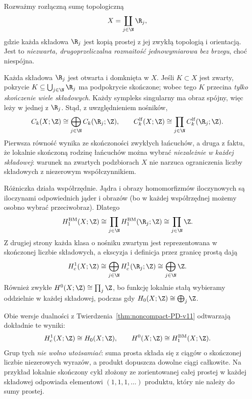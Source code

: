 \begin{przyklad}
\label{prz:BM-countable-lines}
Rozważmy rozłączną sumę topologiczną
\[
 X=\coprod_{j\in\N}\R_j,
\]
gdzie każda składowa $\R_j$ jest kopią prostej
z jej zwykłą topologią i orientacją.
Jest to \emph{niezwarta, drugoprzeliczalna
rozmaitość jednowymiarowa bez brzegu}, choć niespójna.

Każda składowa $\R_j$ jest otwarta i domknięta w $X$.
Jeśli $K\subset X$ jest zwarty, pokrycie
$K\subseteq\bigcup_{j\in\N}\R_j$
ma podpokrycie skończone; wobec tego
$K$ przecina \emph{tylko skończenie wiele składowych}.
Każdy sympleks singularny ma obraz spójny,
więc leży w jednej z $\R_j$.
Stąd, z uwzględnieniem nośników,
\[
 C_k(X;\Z)\cong\bigoplus_{j\in\N}C_k(\R_j;\Z),
 \qquad
 C_k^{\mathrm{lf}}(X;\Z)\cong
     \prod_{j\in\N}C_k^{\mathrm{lf}}(\R_j;\Z).
\]
Pierwsza równość wynika ze skończoności
zwykłych łańcuchów, a druga z faktu,
że lokalnie skończoną rodzinę łańcuchów
można wybrać \emph{niezależnie w każdej składowej}:
warunek na zwartych podzbiorach $X$
nie narzuca ograniczenia liczby składowych
z niezerowym współczynnikiem.

Różniczka działa współrzędnie.
Jądra i obrazy homomorfizmów iloczynowych
są iloczynami odpowiednich jąder i obrazów
(bo w każdej współrzędnej możemy osobno
wybrać przeciwobraz). Dlatego
\[
 H_1^{\mathrm{BM}}(X;\Z)
 \cong\prod_{j\in\N}
       H_1^{\mathrm{BM}}(\R_j;\Z)
 \cong\prod_{j\in\N}\Z.
\]
Z drugiej strony każda klasa o nośniku zwartym
jest reprezentowana w skończonej liczbie
składowych, a ekscyzja i definicja przez granicę
prostą dają
\[
 H_c^1(X;\Z)
 \cong\bigoplus_{j\in\N}H_c^1(\R_j;\Z)
 \cong\bigoplus_{j\in\N}\Z.
\]
Również zwykłe $H^0(X;\Z)\cong\prod_j\Z$,
bo funkcję lokalnie stałą wybieramy oddzielnie
w każdej składowej, podczas gdy
$H_0(X;\Z)\cong\bigoplus_j\Z$.

Obie wersje dualności
z Twierdzenia~\ref{thm:noncompact-PD-v11}
odtwarzają dokładnie te wyniki:
\[
 H_c^1(X;\Z)\cong H_0(X;\Z),
 \qquad
 H^0(X;\Z)\cong H_1^{\mathrm{BM}}(X;\Z).
\]
Grup tych \emph{nie wolno utożsamiać}:
suma prosta składa się z ciągów o skończonej
liczbie niezerowych wyrazów, a produkt
dopuszcza dowolne ciągi całkowite.
Na przykład lokalnie skończony cykl złożony
ze zorientowanej całej prostej w każdej
składowej odpowiada elementowi
$(1,1,1,\ldots)$ produktu, który
nie należy do sumy prostej.
\end{przyklad}


